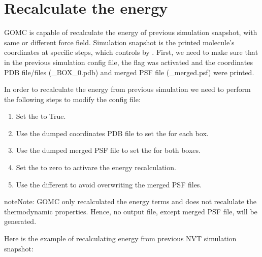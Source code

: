 \documentclass[letterpaper,10pt,english]{sphinxmanual}
\begin{document}
\section{Recalculate the energy}
\label{\detokenize{howto:recalculate-the-energy}}
GOMC is capable of recalculate the energy of previous simulation snapshot, with same or different force field. Simulation snapshot is the printed molecule’s
coordinates at specific steps, which controls by . First, we need to make sure that in the previous simulation config file, the flag 
was activated and the coordinates PDB file/files (\_BOX\_0.pdb) and merged PSF file (\_merged.psf) were printed.

In order to recalculate the energy from previous simulation we need to perform the following steps to modify the config file:
\begin{enumerate}
%
\item {} 
Set the  to True.

\item {} 
Use the dumped coordinates PDB file to set the  for each box.

\item {} 
Use the dumped merged PSF file to set the  for both boxes.

\item {} 
Set the  to zero to activare the energy recalculation.

\item {} 
Use the different  to avoid overwriting the merged PSF files.

\end{enumerate}

\begin{sphinxadmonition}{note}{Note:}
GOMC only recalculated the energy terms and does not recalulate the thermodynamic properties. Hence, no output file, except merged PSF file, will be
generated.
\end{sphinxadmonition}

Here is the example of recalculating energy from previous NVT simulation snapshot:
\end{document}
